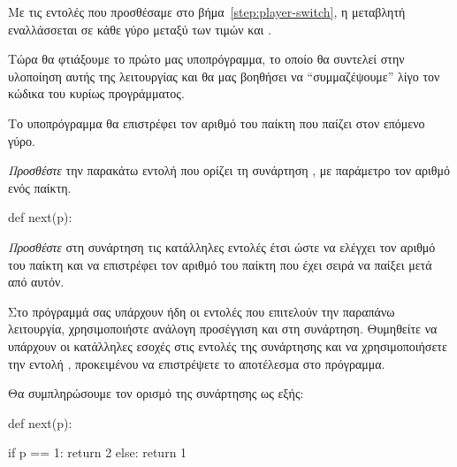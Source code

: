 \documentclass[a4paper,11pt,oneside]{book}
\begin{document}
\begin{step}
Με τις εντολές που προσθέσαμε στο βήμα~\ref{step:player-switch}, η μεταβλητή  εναλλάσσεται σε κάθε γύρο μεταξύ των τιμών  και . 

Τώρα θα φτιάξουμε το πρώτο μας υποπρόγραμμα, το οποίο θα συντελεί στην υλοποίηση αυτής της λειτουργίας και θα μας βοηθήσει να ``συμμαζέψουμε'' λίγο τον κώδικα του κυρίως προγράμματος. 

Το υποπρόγραμμα θα επιστρέφει τον αριθμό του παίκτη που παίζει στον επόμενο γύρο. 


\emph{Προσθέστε} την παρακάτω εντολή που ορίζει τη συνάρτηση , με παράμετρο τον αριθμό  ενός παίκτη.

\begin{pynew}
def next(p):
\end{pynew}

\emph{Προσθέστε} στη συνάρτηση τις κατάλληλες εντολές έτσι ώστε να ελέγχει τον αριθμό  του παίκτη και να επιστρέφει τον αριθμό του παίκτη που έχει σειρά να παίξει μετά από αυτόν. 

\begin{note}
Στο πρόγραμμά σας υπάρχουν ήδη οι εντολές που επιτελούν την παραπάνω λειτουργία, χρησιμοποιήστε ανάλογη προσέγγιση και στη συνάρτηση. Θυμηθείτε να υπάρχουν οι κατάλληλες εσοχές στις εντολές της συνάρτησης και να χρησιμοποιήσετε την εντολή , προκειμένου να επιστρέψετε το αποτέλεσμα στο πρόγραμμα.
\end{note}

\begin{answer}
Θα συμπληρώσουμε τον ορισμό της συνάρτησης  ως εξής:

\begin{pyplain}
def next(p):
\end{pyplain}
\begin{pynew}
    if p == 1:
        return 2
    else:
        return 1
\end{pynew}


\end{answer}
\end{step}
\end{document}

